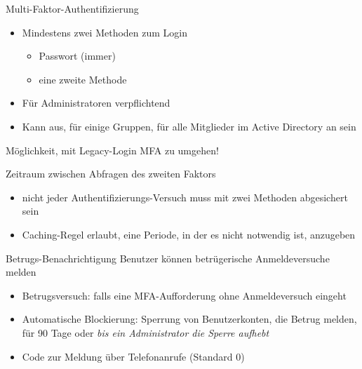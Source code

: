 
\begin{flashcard}[Definition]{Multi-Faktor-Authentifizierung}
    \begin{itemize}
        \item Mindestens zwei Methoden zum Login
            \begin{itemize}
                \item Passwort (immer)
                \item eine zweite Methode
            \end{itemize}
        \item Für Administratoren verpflichtend
        \item Kann aus, für einige Gruppen, für alle Mitglieder im Active Directory an sein
    \end{itemize}
    \vspace{1cm}
    Möglichkeit, mit Legacy-Login MFA zu umgehen!
\end{flashcard}


\begin{flashcard}[Definition]{Zeitraum zwischen Abfragen des zweiten Faktors}
    \begin{itemize}
        \item nicht jeder Authentifizierungs-Versuch muss mit zwei Methoden abgesichert sein
        \item Caching-Regel erlaubt, eine Periode, in der es nicht notwendig ist, anzugeben
    \end{itemize}
\end{flashcard}


\begin{flashcard}[Definition]{Betrugs-Benachrichtigung}
    Benutzer können betrügerische Anmeldeversuche melden
    \begin{itemize}
        \item Betrugsversuch:\newline
            falls eine MFA-Aufforderung ohne Anmeldeversuch eingeht
        \item Automatische Blockierung:\newline
            Sperrung von Benutzerkonten, die Betrug melden, für 90 Tage oder \emph{bis ein Administrator die Sperre aufhebt}
        \item Code zur Meldung über Telefonanrufe (Standard 0)
    \end{itemize}
\end{flashcard}

